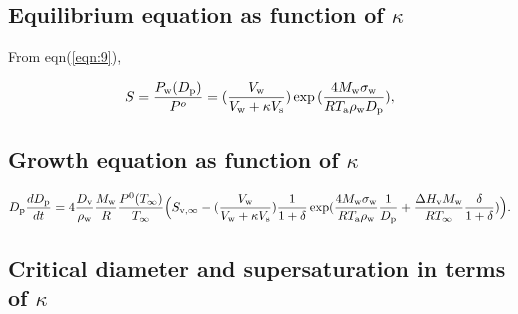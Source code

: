 \documentclass[12pt]{article}
\begin{document}

\subsection{Equilibrium equation as function of $\kappa$}

From eqn(\ref{eqn:9}),

\begin{equation}\label{eqn:19}
S=\frac{P_{\rm w}(D_{\rm p})}{P^{o}}=(\frac{V_{\rm w}}{V_{\rm w} + \kappa V_{\rm s}})   \exp{(\frac{4 M_{\rm w} \sigma_{\rm w}}{R T_{\rm a} \rho_{\rm w} D_{\rm p}})},
\end{equation}






\subsection{Growth equation as function of $\kappa$ }

\begin{equation}\label{eqn:22}
D_{\rm p}\frac{dD_{\rm p}}{dt}=4 \frac{D_{\rm v}} {\rho_{\rm w}} \frac{M_{\rm w}}{R} \frac{P^{\rm 0}(T_{\infty})} {T_{\infty}} \Big(S_{\rm v, \infty} -  (\frac{V_{\rm w}}{V_{\rm w} + \kappa V_{\rm s}}) \frac{1}{1+\delta} \exp(\frac{4 M_{\rm w}\sigma_{\rm w}}{R T_{\rm a} \rho_{\rm w}}\frac{1}{D_{\rm p}}+\frac{\Delta H_{\rm v} M_{\rm w}}{R T_{\infty}} \frac{\delta}{1+\delta})\Big).
\end{equation}


\subsection{Critical diameter and supersaturation in terms of $\kappa$}
\end{document}
